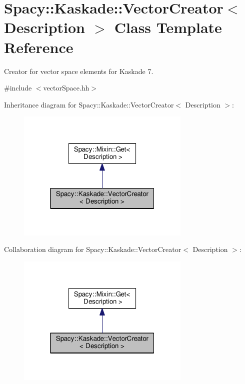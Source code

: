 \hypertarget{classSpacy_1_1Kaskade_1_1VectorCreator}{}\section{Spacy\+:\+:Kaskade\+:\+:Vector\+Creator$<$ Description $>$ Class Template Reference}
\label{classSpacy_1_1Kaskade_1_1VectorCreator}


Creator for vector space elements for Kaskade 7.  




{\ttfamily \#include $<$vector\+Space.\+hh$>$}



Inheritance diagram for Spacy\+:\+:Kaskade\+:\+:Vector\+Creator$<$ Description $>$\+:
\nopagebreak
\begin{figure}[H]
\begin{center}
\leavevmode
\includegraphics[width=235pt]{classSpacy_1_1Kaskade_1_1VectorCreator__inherit__graph}
\end{center}
\end{figure}


Collaboration diagram for Spacy\+:\+:Kaskade\+:\+:Vector\+Creator$<$ Description $>$\+:
\nopagebreak
\begin{figure}[H]
\begin{center}
\leavevmode
\includegraphics[width=235pt]{classSpacy_1_1Kaskade_1_1VectorCreator__coll__graph}
\end{center}
\end{figure}
